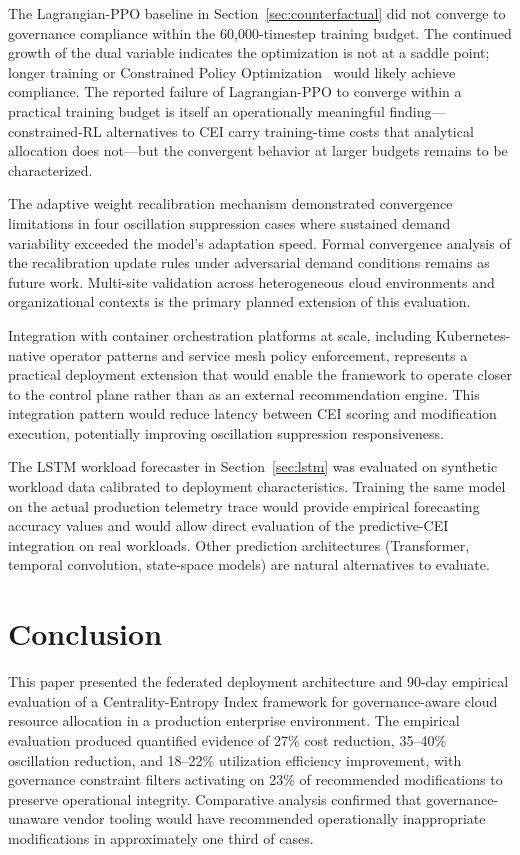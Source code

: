 \documentclass[runningheads]{llncs}
\begin{document}
The Lagrangian-PPO baseline in Section~\ref{sec:counterfactual} did not converge to governance compliance within the 60{,}000-timestep training budget. The continued growth of the dual variable indicates the optimization is not at a saddle point; longer training or Constrained Policy Optimization~\cite{achiam} would likely achieve compliance. The reported failure of Lagrangian-PPO to converge within a practical training budget is itself an operationally meaningful finding---constrained-RL alternatives to CEI carry training-time costs that analytical allocation does not---but the convergent behavior at larger budgets remains to be characterized.

The adaptive weight recalibration mechanism demonstrated convergence limitations in four oscillation suppression cases where sustained demand variability exceeded the model's adaptation speed. Formal convergence analysis of the recalibration update rules under adversarial demand conditions remains as future work. Multi-site validation across heterogeneous cloud environments and organizational contexts is the primary planned extension of this evaluation.

Integration with container orchestration platforms at scale, including Kubernetes-native operator patterns and service mesh policy enforcement, represents a practical deployment extension that would enable the framework to operate closer to the control plane rather than as an external recommendation engine. This integration pattern would reduce latency between CEI scoring and modification execution, potentially improving oscillation suppression responsiveness.

The LSTM workload forecaster in Section~\ref{sec:lstm} was evaluated on synthetic workload data calibrated to deployment characteristics. Training the same model on the actual production telemetry trace would provide empirical forecasting accuracy values and would allow direct evaluation of the predictive-CEI integration on real workloads. Other prediction architectures (Transformer, temporal convolution, state-space models) are natural alternatives to evaluate.

\section{Conclusion}
\label{sec:conclusion}

This paper presented the federated deployment architecture and 90-day empirical evaluation of a Centrality-Entropy Index framework for governance-aware cloud resource allocation in a production enterprise environment. The empirical evaluation produced quantified evidence of 27\% cost reduction, 35--40\% oscillation reduction, and 18--22\% utilization efficiency improvement, with governance constraint filters activating on 23\% of recommended modifications to preserve operational integrity. Comparative analysis confirmed that governance-unaware vendor tooling would have recommended operationally inappropriate modifications in approximately one third of cases.
\end{document}
